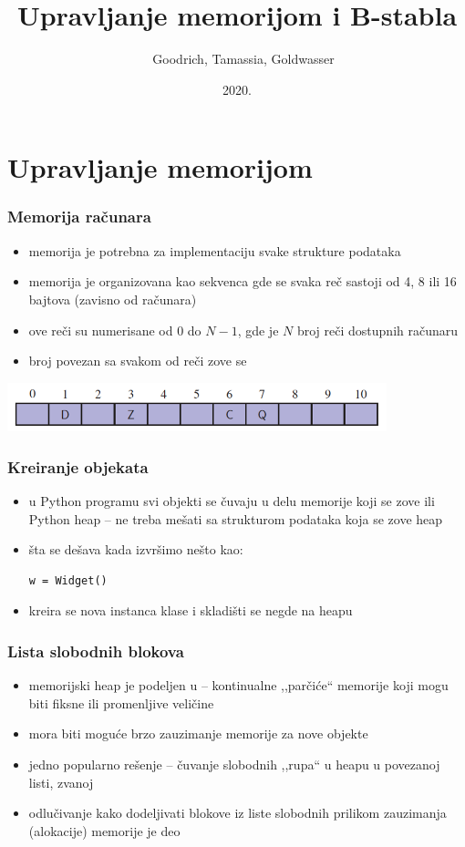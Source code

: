 \documentclass[compress,aspectratio=169]{beamer}
\title{Upravljanje memorijom i B-stabla}
\author{\textcopyright \ \ Goodrich, Tamassia, Goldwasser}
\institute{Katedra za informatiku, Fakultet tehničkih nauka, Univerzitet u
Novom Sadu}
\date{2020.}
\begin{document}
\frame{\titlepage}

\section[Memorija]{Upravljanje memorijom}

\begin{frame}[fragile]
  \frametitle{Memorija računara}
  \begin{itemize}
    \item memorija je potrebna za implementaciju svake strukture podataka
    \item memorija je organizovana kao sekvenca  gde se svaka
    reč sastoji od 4, 8 ili 16 bajtova (zavisno od računara)
    \item ove reči su numerisane od $0$ do $N-1$, gde je $N$ broj reči
    dostupnih računaru
    \item broj povezan sa svakom od reči zove se 
  \end{itemize}
  \begin{center}
    \includegraphics[width=11cm]{asp-15-pic01.png}
  \end{center}
\end{frame}

\begin{frame}[fragile]
  \frametitle{Kreiranje objekata}
  \begin{itemize}
    \item u Python programu svi objekti se čuvaju u delu memorije koji 
    se zove  ili Python heap -- ne treba mešati sa 
    strukturom podataka koja se zove heap
    \item šta se dešava kada izvršimo nešto kao:
\begin{verbatim}
w = Widget()
\end{verbatim}
    \item kreira se nova instanca klase i skladišti se negde na heapu
  \end{itemize}
\end{frame}

\begin{frame}[fragile]
  \frametitle{Lista slobodnih blokova}
  \begin{itemize}
    \item memorijski heap je podeljen u  -- kontinualne 
    ,,parčiće`` memorije koji mogu biti fiksne ili promenljive veličine
    \item mora biti moguće brzo zauzimanje memorije za nove objekte
    \item jedno popularno rešenje -- čuvanje slobodnih ,,rupa`` u heapu
    u povezanoj listi, zvanoj 
    \item odlučivanje kako dodeljivati blokove iz liste slobodnih 
    prilikom zauzimanja (alokacije) memorije je deo 
  \end{itemize}
\end{frame}
\end{document}
